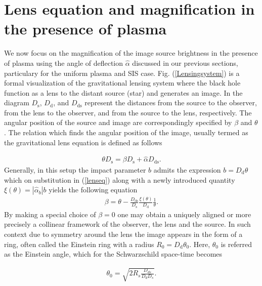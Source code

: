 \documentclass[final,5p,times,twocolumn,unknownkeysallowed]{elsarticle}
\begin{document}
\section{Lens equation and magnification in the presence of plasma}\label{Magnification}
We now focus on the magnification of the image source brightness in
the presence of plasma using the angle of deflection $\hat{\alpha}$
discussed in our previous sections, particulary for the uniform plasma and SIS case. Fig. (\ref{Lensingsystem}) is a formal
visualization of the gravitational lensing system where the black hole
function as a lens to the distant source (star) and generates an image. In the diagram
$D_\mathrm{s}$, $D_\mathrm{d}$, and $D_\mathrm{ds}$ represent the distances from the source to the
observer, from the lens to the observer, and from the source to the lens, respectively. The angular
position of the source and image are correspondingly specified by $\beta$ and $\theta$.
The relation which finds the angular position
of the image, usually termed as the gravitational lens equation is defined as follows \cite{Abu:2013a,Abu:2017a}

\begin{align}\label{lenseq}
\theta D_\mathrm{s}=\beta D_\mathrm{s}+\hat{\alpha}D_\mathrm{ds}.
\end{align}
Generally, in this setup the impact parameter $b$ admits the expression $b= D_\mathrm{d}\theta$ which on substitution in (\ref{lenseq})
along with a newly introduced quantity $\xi(\theta)=|\hat{\alpha}_b|b$ yields the following equation
\begin{align}\label{newlenseq}
\beta=\theta -\frac{D_\mathrm{ds}}{D_\mathrm{s}}\frac{\xi(\theta)}{D_\mathrm{d}}\frac{1}{\theta}.
\end{align}
By making a special choice of $\beta=0$ one may obtain a uniquely aligned
or more precisely a collinear framework of the observer, the lens and the source.
In such context due to symmetry around the lens the image appears in the form of a ring, often called the Einstein ring
with a radius $R_0=D_\mathrm{d}\theta_0$. Here, $\theta_0$ is referred as the Einstein angle, which for
the Schwarzschild space-time becomes

\begin{align}
\theta_0=\sqrt{2R_s\frac{D_{ds}}{D_dD_s}}.
\end{align}
\end{document}

